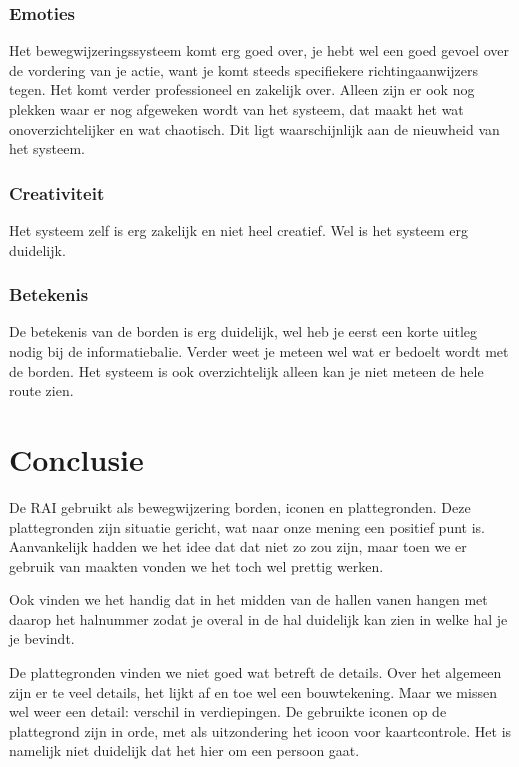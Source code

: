 \subsubsection{Emoties}

Het bewegwijzeringssysteem komt erg goed over, je hebt wel een goed gevoel over de vordering van je actie, want je komt steeds specifiekere richtingaanwijzers tegen. Het komt verder professioneel en zakelijk over. Alleen zijn er ook nog plekken waar er nog afgeweken wordt van het systeem, dat maakt het wat onoverzichtelijker en wat chaotisch. Dit ligt waarschijnlijk aan de nieuwheid van het systeem.


\subsubsection{Creativiteit}

Het systeem zelf is erg zakelijk en niet heel creatief. Wel is het systeem erg duidelijk.


\subsubsection{Betekenis}

De betekenis van de borden is erg duidelijk, wel heb je eerst een korte uitleg nodig bij de informatiebalie.  Verder weet je meteen wel wat er bedoelt wordt met de borden. Het systeem is ook overzichtelijk alleen kan je niet meteen de hele route zien.


\section{Conclusie}

De RAI gebruikt als bewegwijzering borden, iconen en plattegronden. Deze plattegronden zijn situatie gericht, wat naar onze mening een positief punt is. Aanvankelijk hadden we het idee dat dat niet zo zou zijn, maar toen we er gebruik van maakten vonden we het toch wel prettig werken.

Ook vinden we het handig dat in het midden van de hallen vanen hangen met daarop het halnummer zodat je overal in de hal duidelijk kan zien in welke hal je je bevindt.

De plattegronden vinden we niet goed wat betreft de details. Over het algemeen zijn er te veel details, het lijkt af en toe wel een bouwtekening. Maar we missen wel weer een detail: verschil in verdiepingen. De gebruikte iconen op de plattegrond zijn in orde, met als uitzondering het icoon voor kaartcontrole. Het is namelijk niet duidelijk dat het hier om een persoon gaat.

